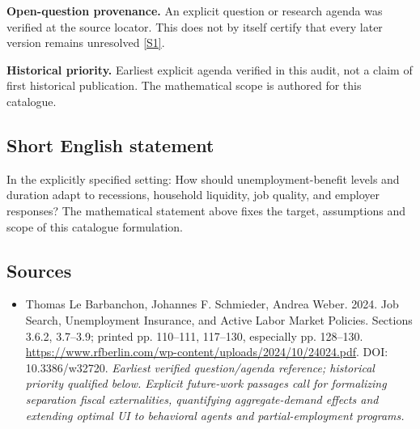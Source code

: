 \documentclass[11pt]{article}
\newcommand{\sref}[2]{\hyperlink{source:#1:#2}{[S#2]}}
\begin{document}
\par\textbf{Open-question provenance.} An explicit question or research agenda was verified at the source locator. This does not by itself certify that every later version remains unresolved \sref{30007760}{1}.

\par\textbf{Historical priority.} Earliest explicit agenda verified in this audit, not a claim of first historical publication. The mathematical scope is authored for this catalogue.

\subsection{Short English statement}
In the explicitly specified setting: How should unemployment-benefit levels and duration adapt to recessions, household liquidity, job quality, and employer responses? The mathematical statement above fixes the target, assumptions and scope of this catalogue formulation.

\subsection{Sources}
\begin{itemize}\raggedright
\item[\textnormal{[S1]}]\hypertarget{source:30007760:1}{} Thomas Le Barbanchon, Johannes F. Schmieder, Andrea Weber. 2024. Job Search, Unemployment Insurance, and Active Labor Market Policies. Sections 3.6.2, 3.7–3.9; printed pp. 110–111, 117–130, especially pp. 128–130.
\url{https://www.rfberlin.com/wp-content/uploads/2024/10/24024.pdf}.
DOI: 10.3386/w32720.
{\small\textit{Earliest verified question/agenda reference; historical priority qualified below. Explicit future-work passages call for formalizing separation fiscal externalities, quantifying aggregate-demand effects and extending optimal UI to behavioral agents and partial-employment programs.}}
\end{itemize}
\end{document}
